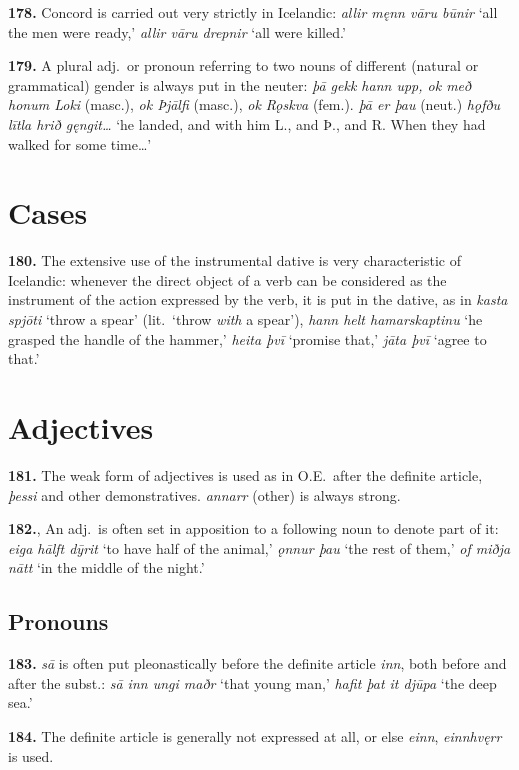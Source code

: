\documentclass[12pt,letterpaper]{book}
\begin{document}
\textbf{178.} Concord is carried out very strictly in Icelandic: \textit{allir
męnn vāru būnir} `all the men were ready,' \textit{allir vāru drepnir}
`all were killed.'

\textbf{179.} A plural adj.\ or pronoun referring to two nouns of different
(natural or grammatical) gender is always put in the neuter: \textit{þā
gekk hann upp, ok með honum Loki} (masc.), \textit{ok Þjālfi} (masc.),
\textit{ok Rǫskva} (fem.).  \textit{þā er þau} (neut.) \textit{hǫfðu lītla hrið
gęngit\ldots} `he landed, and with him L., and Þ., and R\@.  When they
had walked for some time\ldots'

\section{Cases}

\textbf{180.} The extensive use of the instrumental dative is very
characteristic of Icelandic: whenever the direct object of a verb
can be considered as the instrument of the action expressed by
the verb, it is put in the dative, as in \textit{kasta spjōti} `throw a
spear' (lit.\ `throw \textit{with} a spear'), \textit{hann helt hamarskaptinu}
`he grasped the handle of the hammer,' \textit{heita þvī} `promise
that,' \textit{jāta þvī} `agree to that.'

\section{Adjectives}

\textbf{181.} The weak form of adjectives is used as in O.E.\ after the
definite article, \textit{þessi} and other demonstratives.  \textit{annarr}
(other) is always strong.

\textbf{182.}, An adj.\ is often set in apposition to a following noun to
denote part of it: \textit{eiga hālft dȳrit} `to have half of the
animal,' \textit{ǫnnur þau} `the rest of them,' \textit{of miðja nātt} `in the
middle of the night.'

\subsection{Pronouns}

\textbf{183.} \textit{sā} is often put pleonastically before the definite article
\textit{inn}, both before and after the subst.: \textit{sā inn ungi maðr} `that
young man,' \textit{hafit þat it djūpa} `the deep sea.'

\textbf{184.} The definite article is generally not expressed at all, or
else \textit{einn}, \textit{einnhvęrr} is used.
\end{document}
